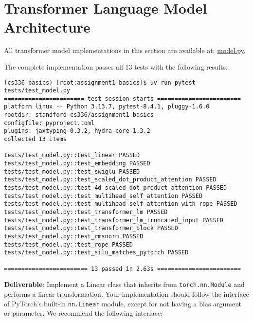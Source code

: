 \section{Transformer Language Model Architecture}

All transformer model implementations in this section are available at: \href{https://github.com/donglinkang2021/cs336-assignment1-basics/blob/main/cs336_basics/model.py}{model.py}.

The complete implementation passes all 13 tests with the following results:
\begin{lstlisting}
(cs336-basics) [root:assignment1-basics]$ uv run pytest tests/test_model.py
======================= test session starts ========================
platform linux -- Python 3.13.7, pytest-8.4.1, pluggy-1.6.0
rootdir: standford-cs336/assignment1-basics
configfile: pyproject.toml
plugins: jaxtyping-0.3.2, hydra-core-1.3.2
collected 13 items                                                 

tests/test_model.py::test_linear PASSED
tests/test_model.py::test_embedding PASSED
tests/test_model.py::test_swiglu PASSED
tests/test_model.py::test_scaled_dot_product_attention PASSED
tests/test_model.py::test_4d_scaled_dot_product_attention PASSED
tests/test_model.py::test_multihead_self_attention PASSED
tests/test_model.py::test_multihead_self_attention_with_rope PASSED
tests/test_model.py::test_transformer_lm PASSED
tests/test_model.py::test_transformer_lm_truncated_input PASSED
tests/test_model.py::test_transformer_block PASSED
tests/test_model.py::test_rmsnorm PASSED
tests/test_model.py::test_rope PASSED
tests/test_model.py::test_silu_matches_pytorch PASSED

======================== 13 passed in 2.63s ========================
\end{lstlisting}


\textbf{Deliverable}: Implement a Linear class that inherits from \lstinline{torch.nn.Module} and performs a linear transformation. Your implementation should follow the interface of PyTorch's built-in \lstinline{nn.Linear} module, except for not having a bias argument or parameter. We recommend the following interface:

